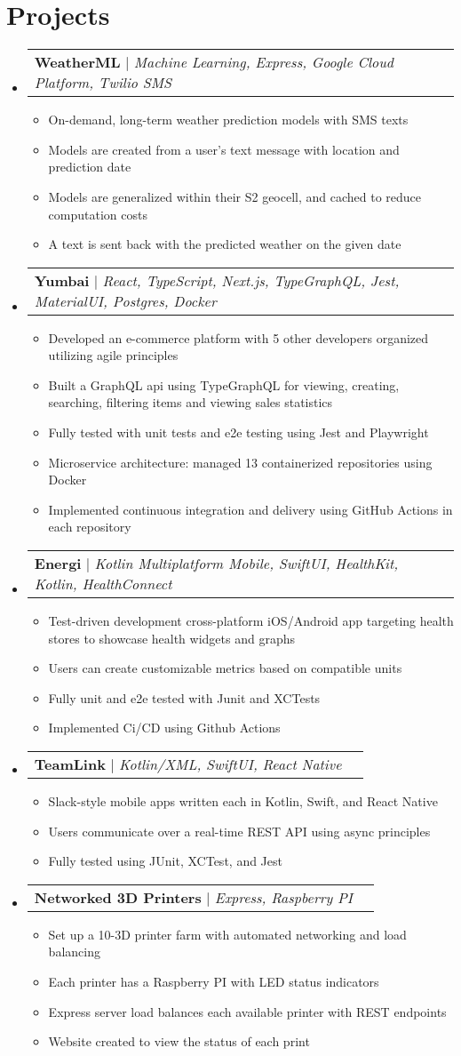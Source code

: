 \documentclass[letterpaper,11pt]{article}
\makeatletter
\newcommand{\resumeItem}[1]{
  \item\small{
    {#1 \vspace{-2pt}}
  }
}
\newcommand{\resumeProjectHeading}[2]{
    \item
    \begin{tabular*}{0.97\textwidth}{l@{\extracolsep{\fill}}r}
      \small#1 & #2 \\
    \end{tabular*}\vspace{-7pt}
}
\newcommand{\resumeSubHeadingListStart}{\begin{itemize}[leftmargin=0.15in, label={}]}
\newcommand{\resumeSubHeadingListEnd}{\end{itemize}}
\newcommand{\resumeItemListStart}{\begin{itemize}}
\newcommand{\resumeItemListEnd}{\end{itemize}\vspace{-5pt}}
\makeatother
\begin{document}
\section{Projects}
    \resumeSubHeadingListStart
      \resumeProjectHeading
          {\textbf{WeatherML} $|$ \emph{Machine Learning, Express, Google Cloud Platform, Twilio SMS}}{}
          \resumeItemListStart
            \resumeItem{On-demand, long-term weather prediction models with SMS texts}
            \resumeItem{Models are created from a user's text message with location and prediction date}
            \resumeItem{Models are generalized within their S2 geocell, and cached to reduce computation costs}
            \resumeItem{A text is sent back with the predicted weather on the given date}
          \resumeItemListEnd
      \resumeProjectHeading
          {\textbf{Yumbai} $|$ \emph{React, TypeScript, Next.js, TypeGraphQL, Jest, MaterialUI, Postgres, Docker}}{}
          \resumeItemListStart
            \resumeItem{Developed an e-commerce platform with 5 other developers organized utilizing agile principles}
            \resumeItem{Built a GraphQL api using TypeGraphQL for viewing, creating, searching, filtering items and viewing sales statistics}
            \resumeItem{Fully tested with unit tests and e2e testing using Jest and Playwright}
            \resumeItem{Microservice architecture: managed 13 containerized repositories using Docker}
            \resumeItem{Implemented continuous integration and delivery using GitHub Actions in each repository}
          \resumeItemListEnd
        \resumeProjectHeading
          {\textbf{Energi} $|$ \emph{Kotlin Multiplatform Mobile, SwiftUI, HealthKit, Kotlin, HealthConnect}}{}
          \resumeItemListStart
            \resumeItem{Test-driven development cross-platform iOS/Android app targeting health stores to showcase health widgets and graphs}
            \resumeItem{Users can create customizable metrics based on compatible units}
            \resumeItem{Fully unit and e2e tested with Junit and XCTests}
            \resumeItem{Implemented Ci/CD using Github Actions}
          \resumeItemListEnd
        \resumeProjectHeading
          {\textbf{TeamLink} $|$ \emph{Kotlin/XML, SwiftUI, React Native}}{}
          \resumeItemListStart
            \resumeItem{Slack-style mobile apps written each in Kotlin, Swift, and React Native}
            \resumeItem{Users communicate over a real-time REST API using async principles}
            \resumeItem{Fully tested using JUnit, XCTest, and Jest}
          \resumeItemListEnd
        \resumeProjectHeading
          {\textbf{Networked 3D Printers} $|$ \emph{Express, Raspberry PI}}{}
          \resumeItemListStart
            \resumeItem{Set up a 10-3D printer farm with automated networking and load balancing}
            \resumeItem{Each printer has a Raspberry PI with LED status indicators}
            \resumeItem{Express server load balances each available printer with REST endpoints}
            \resumeItem{Website created to view the status of each print}
          \resumeItemListEnd
    \resumeSubHeadingListEnd
\end{document}
